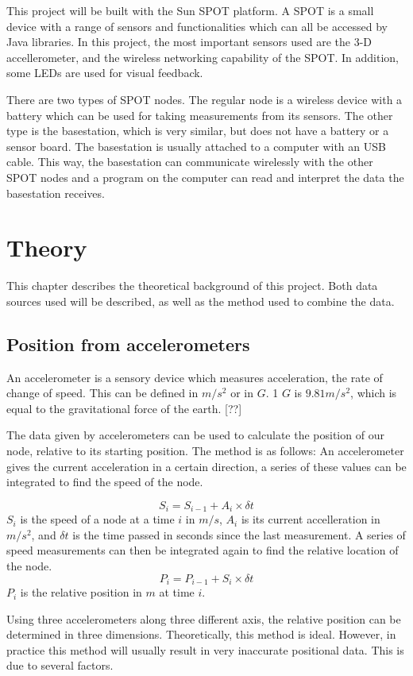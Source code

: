 \documentclass[twoside, 11pt]{uva-bachelor-thesis}
\begin{document}
This project will be built with the Sun SPOT platform. A SPOT is a small device with a range of sensors and functionalities which can all be accessed by Java libraries. In this project, the most important sensors used are the 3-D accellerometer, and the wireless networking capability of the SPOT. In addition, some LEDs are used for visual feedback.

There are two types of SPOT nodes. The regular node is a wireless device with a battery which can be used for taking measurements from its sensors. The other type is the basestation, which is very similar, but does not have a battery or a sensor board. The basestation is usually attached to a computer with an USB cable. This way, the basestation can communicate wirelessly with the other SPOT nodes and a program on the computer can read and interpret the data the basestation receives.

\chapter{Theory}
This chapter describes the theoretical background of this project. Both data sources used will be described, as well as the method used to combine the data.
\section{Position from accelerometers}
An accelerometer is a sensory device which measures acceleration, the rate of change of speed. This can be defined in $m/s^2$ or in $G$. 1 $G$ is $9.81 m/s^2$, which is equal to the gravitational force of the earth. [??]

The data given by accelerometers can be used to calculate the position of our node, relative to its starting position. The method is as follows: An accelerometer gives the current acceleration in a certain direction, a series of these values can be integrated to find the speed of the node. 

$$S_i = S_{i-1} + A_i \times \delta t$$ 
$S_i$ is the speed of a node at a time $i$ in $m/s$, $A_i$ is its current accelleration in $m/s^2$, and $\delta t$ is the time passed in seconds since the last measurement.
A series of speed measurements can then be integrated again to find the relative location of the node.
$$P_i = P_{i-1} + S_i \times \delta t$$
$P_i$ is the relative position in $m$ at time $i$.


Using three accelerometers along three different axis, the relative position can be determined in three dimensions. Theoretically, this method is ideal. However, in practice this method will usually result in very inaccurate positional data. This is due to several factors.
\end{document}
